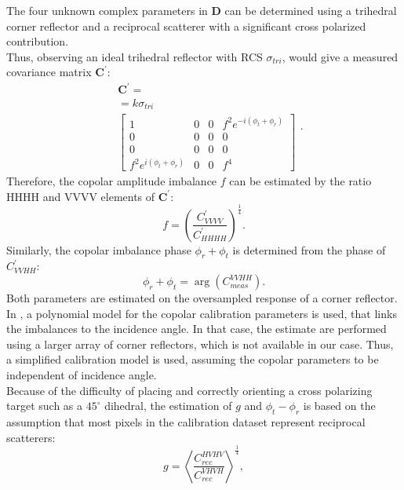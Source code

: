 The four unknown complex parameters in $\mathbf{D}$ can be determined using a trihedral corner reflector and a reciprocal scatterer with a significant cross polarized contribution\cite{Sarabandi1989,Pipia2009}.\\
Thus, observing an ideal trihedral reflector with RCS $\sigma_{tri}$, would give 
a measured covariance matrix $\mathbf{C^{\prime}}$:
\begin{equation}
	\begin{aligned}
	&\mathbf{C^{\prime}} =\\
	&= k \sigma_{tri}\\
	&\begin{bmatrix}
		1 & 0 & 0 & f^2 e^{-i \left(\phi_t + \phi_r\right)}\\
		0 & 0 & 0 & 0\\
		0 & 0 & 0 & 0\\
		f^2 e^{i \left(\phi_t + \phi_r\right)} & 0 & 0 & f^4
	\end{bmatrix}
	\end{aligned}.
\end{equation}
Therefore, the  copolar amplitude imbalance $f$ can be estimated by the ratio HHHH and VVVV elements of $\mathbf{C^{\prime}}$:
\begin{equation}
	f = \left(\frac{C^{\prime}_{VVVV}}{C^{\prime}_{HHHH}}\right)^{\frac{1}{4}}.
\end{equation}
Similarly, the copolar imbalance phase $\phi_r + \phi_t$ is determined from the phase of $C_{VVHH}^{\prime}$:
\begin{equation}
	\phi_r + \phi_t = \operatorname{arg}\left(C_{meas}^{VVHH}\right).
\end{equation}
Both parameters are estimated on the oversampled response of a corner reflector. In \cite{Fore2015}, a polynomial model for the copolar calibration parameters is used, that links the imbalances to the incidence angle. In that case, the estimate are performed using a larger array of corner reflectors, which is not available in our case. Thus, a simplified calibration model is used, assuming the copolar parameters to be independent of incidence angle.\\ 
Because of the difficulty of placing and correctly orienting a cross polarizing target such as a $45^\circ$ dihedral, the estimation of $g$ and $\phi_t - \phi_r$ is based on the assumption that most pixels in the calibration dataset represent reciprocal scatterers:
\begin{equation}
	g = \left<\frac{C_{rec}^{HVHV}}{C_{rec}^{VHVH}}\right>^\frac{1}{4},
\end{equation}
